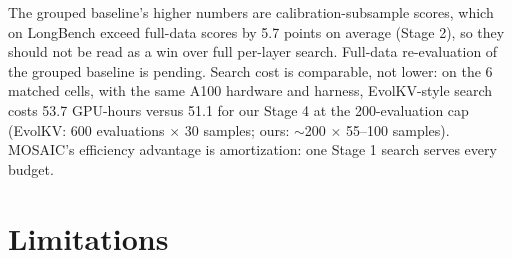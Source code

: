 \documentclass[11pt]{article}
\begin{document}
The grouped baseline's higher numbers are calibration-subsample scores, which on LongBench exceed full-data scores by 5.7 points on average (Stage 2), so they should not be read as a win over full per-layer search. Full-data re-evaluation of the grouped baseline is pending. Search cost is comparable, not lower: on the 6 matched cells, with the same A100 hardware and harness, EvolKV-style search costs 53.7 GPU-hours versus 51.1 for our Stage 4 at the 200-evaluation cap (EvolKV: 600 evaluations $\times$ 30 samples; ours: $\sim$200 $\times$ 55--100 samples). MOSAIC's efficiency advantage is amortization: one Stage 1 search serves every budget.

\section{Limitations}
\end{document}
